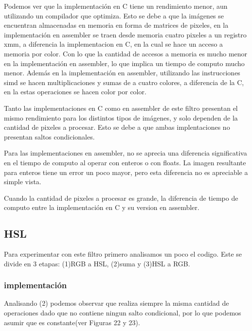 \documentclass[a4paper]{article}
\begin{document}
Podemos ver que la implementación en C tiene un rendimiento menor, aun utilizando un compilador que optimiza. Esto se debe a que la imágenes se encuentran almacenadas en memoria en forma de matrices de pixeles, en la implementación en assembler se traen desde memoria cuatro pixeles a un registro xmm, a diferencia la implementacion en C, en la cual se hace un acceso a memoria por color. Con lo que la cantidad de accesos a memoria es mucho menor en la implementación en assembler, lo que implica un tiempo de computo mucho menor. Además en la implementación en assembler, utilizando las instrucciones simd se hacen multiplicaciones y sumas de a cuatro colores, a diferencia de la C, en la estas operaciones se hacen color por color.

Tanto las implementaciones en C como en assembler de este filtro presentan el mismo rendimiento para los distintos tipos de imágenes, y solo dependen de la cantidad de pixeles a procesar. Esto se debe a que ambas implentaciones no presentan saltos condicionales.

Para las implementaciones en assembler, no se aprecia una diferencia significativa en el tiempo de computo al operar con enteros o con floats. La imagen resultante para enteros tiene un error un poco mayor, pero esta diferencia no es apreciable a simple vista.

Cuando la cantidad de pixeles a procesar es grande, la diferencia de tiempo de computo entre la implementación en C y su version en assembler.

\subsection{HSL}
Para experimentar con este filtro primero analisamos un poco el codigo. Este se divide en 3 etapas: (1)RGB a HSL, (2)suma y (3)HSL a RGB.

\subsubsection{implementación}
 Analisando (2) podemos observar que realiza siempre la misma cantidad de operaciones dado que no contiene ningun salto condicional, por lo que podemos asumir que es constante(ver Figuras 22 y 23).
\end{document}
